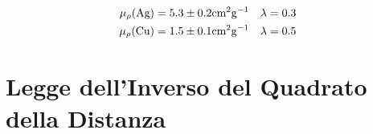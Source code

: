 \documentclass[twocolumn,10pt]{asme2ej}
\begin{document}
 \vspace{-15pt}
\begin{align*}
    \mu_{\rho}(\text{Ag}) &= 5.3\pm 0.2 \si{\centi\metre^2\gram^{-1}} & \lambda &= 0.3 \\
    \mu_{\rho}(\text{Cu}) &= 1.5\pm 0.1 \si{\centi\metre^2\gram^{-1}} & \lambda &= 0.5 
    \vspace{-5pt}
\end{align*}



\begin{table}[t]
    \begin{center}
    \end{center}
    \caption{Dati fit esponenziale per il calcolo del coefficiente di assorbimento}
    \label{t:assorbimento}
\end{table}




\section{Legge dell'Inverso del Quadrato della Distanza}\label{s:distanza}
\end{document}
